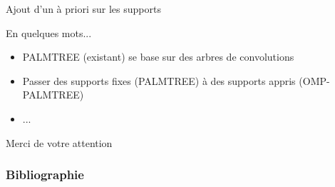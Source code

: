 \begin{frame}{Ajout d'un à priori sur les supports}
\begin{figure}\centering
\end{figure}
\end{frame}


\begin{frame}{En quelques mots...}
\begin{itemize}
\item PALMTREE (existant) se base sur des arbres de convolutions
\item Passer des supports fixes (PALMTREE) à des supports appris (OMP-PALMTREE)
\item ...
\end{itemize}
\vfill
\hfill Merci de votre attention
\end{frame}

\appendix

\begin{frame}
\frametitle{Bibliographie}
\printbibliography[heading=none]
\end{frame}


